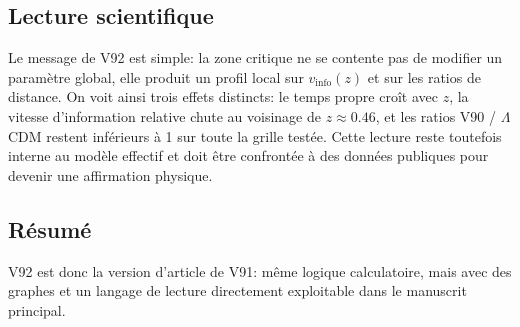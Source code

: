 \subsection{Lecture scientifique}
Le message de V92 est simple: la zone critique ne se contente pas de modifier un paramètre global, elle produit un profil local sur $v_{\mathrm{info}}(z)$ et sur les ratios de distance. On voit ainsi trois effets distincts: le temps propre croît avec $z$, la vitesse d'information relative chute au voisinage de $z\approx0.46$, et les ratios V90 / $\Lambda$CDM restent inférieurs à 1 sur toute la grille testée. Cette lecture reste toutefois interne au modèle effectif et doit être confrontée à des données publiques pour devenir une affirmation physique.

\subsection{Résumé}
V92 est donc la version d'article de V91: même logique calculatoire, mais avec des graphes et un langage de lecture directement exploitable dans le manuscrit principal.
